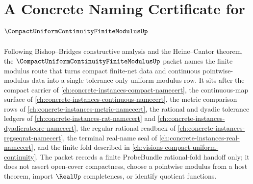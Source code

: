 \chapter{A Concrete Naming Certificate for $\CompactUniformContinuityFiniteModulusUp$}
\label{ch:concrete-instances-compact-uniform-continuity-finite-modulus-namecert}

Following Bishop--Bridges constructive analysis and the Heine--Cantor theorem, the $\CompactUniformContinuityFiniteModulusUp$ packet names the finite modulus route that turns compact finite-net data and continuous pointwise-modulus data into a single tolerance-only uniform-modulus row. It sits after the compact carrier of \autoref{ch:concrete-instances-compact-namecert}, the continuous-map surface of \autoref{ch:concrete-instances-continuous-namecert}, the metric comparison rows of \autoref{ch:concrete-instances-metric-namecert}, the rational and dyadic tolerance ledgers of \autoref{ch:concrete-instances-rat-namecert} and \autoref{ch:concrete-instances-dyadicratcore-namecert}, the regular rational readback of \autoref{ch:concrete-instances-regseqrat-namecert}, the terminal real-name seal of \autoref{ch:concrete-instances-real-namecert}, and the finite fold described in \autoref{ch:visions-compact-uniform-continuity}. The packet records a finite ProbeBundle rational-fold handoff only; it does not assert open-cover compactness, choose a pointwise modulus from a host theorem, import $\RealUp$ completeness, or identify quotient functions.

